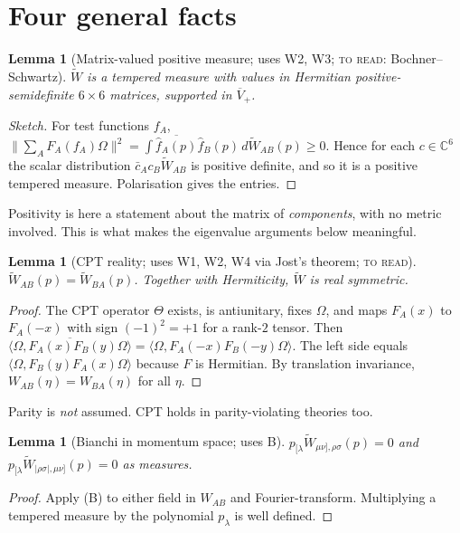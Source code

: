 \documentclass[11pt]{article}
\newtheorem{lemma}[theorem]{Lemma}
\theoremstyle{remark}
\newcommand{\Wt}{\widetilde W}
\begin{document}
\section{Four general facts}

\begin{lemma}[Matrix-valued positive measure; uses W2, W3; \textsc{to read}: Bochner--Schwartz]\label{lem:measure}
$\Wt$ is a tempered measure with values in Hermitian positive-semidefinite
$6\times6$ matrices, supported in $\overline V_+$.
\end{lemma}
\begin{proof}[Sketch]
For test functions $f_A$, $\|\sum_A F_A(f_A)\Omega\|^2
=\int\overline{\hat f_A(p)}\hat f_B(p)\,d\Wt_{AB}(p)\ge0$. Hence for each
$c\in\mathbb C^6$ the scalar distribution $\bar c_A c_B\Wt_{AB}$ is positive
definite, and so it is a positive tempered measure. Polarisation gives the
entries.
\end{proof}

Positivity is here a statement about the matrix of \emph{components}, with no
metric involved. This is what makes the eigenvalue arguments below meaningful.

\begin{lemma}[CPT reality; uses W1, W2, W4 via Jost's theorem; \textsc{to read}]\label{lem:cpt}
$\Wt_{AB}(p)=\Wt_{BA}(p)$. Together with Hermiticity, $\Wt$ is real
symmetric.
\end{lemma}
\begin{proof}
The CPT operator $\Theta$ exists, is antiunitary, fixes $\Omega$, and maps
$F_A(x)$ to $F_A(-x)$ with sign $(-1)^{2}=+1$ for a rank-$2$ tensor. Then
$\overline{\langle\Omega,F_A(x)F_B(y)\Omega\rangle}
=\langle\Omega,F_A(-x)F_B(-y)\Omega\rangle$. The left side equals
$\langle\Omega,F_B(y)F_A(x)\Omega\rangle$ because $F$ is Hermitian. By
translation invariance, $W_{AB}(\eta)=W_{BA}(\eta)$ for all $\eta$.
\end{proof}
Parity is \emph{not} assumed. CPT holds in parity-violating theories too.

\begin{lemma}[Bianchi in momentum space; uses B]\label{lem:bianchi}
$p_{[\lambda}\Wt_{\mu\nu],\rho\sigma}(p)=0$ and
$p_{[\lambda}\Wt_{|\rho\sigma|,\mu\nu]}(p)=0$ as measures.
\end{lemma}
\begin{proof}
Apply (B) to either field in $W_{AB}$ and Fourier-transform. Multiplying a
tempered measure by the polynomial $p_\lambda$ is well defined.
\end{proof}
\end{document}

